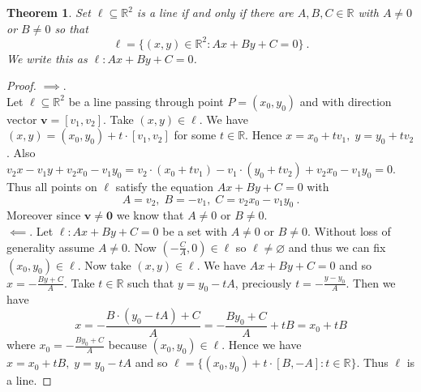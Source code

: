 \documentclass[a4paper,12pt]{report}
\newtheorem{theorem}{Theorem}
\begin{document}
\begin{theorem}\label{Linear Equation Defines a Line}
  Set $\ell\subseteq\mathbb{R}^2$ is a line if and only if there are $A,B,C\in\mathbb{R}$ with $A\ne 0$ or $B\ne 0$ so that 
  \[
    \ell=\{(x,y)\in\mathbb{R}^2:Ax+By+C=0\} ~.
  \]
  We write this as $\ell:Ax+By+C=0$.
\end{theorem}
\begin{proof}

  $\implies$. \\
  Let $\ell\subseteq\mathbb{R}^2$ be a line passing through point $P=(x_0,y_0)$ and with direction vector $\mathbf{v}=[v_1,v_2]$. Take $(x,y)\in\ell$. We have $(x,y)=(x_0,y_0)+t\cdot [v_1,v_2]$ for some $t\in\mathbb{R}$. Hence $x=x_0+tv_1, \; y=y_0+tv_2$. Also $v_2x-v_1y+v_2x_0-v_1y_0=v_2\cdot (x_0+tv_1)-v_1\cdot (y_0+tv_2)+v_2x_0-v_1y_0=0$. Thus all points on $\ell$ satisfy the equation $Ax+By+C=0$ with 
  \[
    A=v_2, \; B=-v_1, \; C=v_2x_0-v_1y_0 ~.
  \]
  Moreover since $\mathbf{v}\ne\mathbf{0}$ we know that $A\ne 0$ or $B\ne 0$.
  \\ $\impliedby$.
  Let $\ell:Ax+By+C=0$ be a set with $A\ne 0$ or $B\ne 0$. Without loss of generality assume $A\ne 0$. Now $(-\frac{C}{A},0)\in\ell$ so $\ell\ne\varnothing$ and thus we can fix $(x_0,y_0)\in\ell$. Now take $(x,y)\in\ell$. We have $Ax+By+C=0$ and so $x=-\frac{By+C}{A}$. Take $t\in\mathbb{R}$ such that $y=y_0-tA$, preciously $t=-\frac{y-y_0}{A}$. Then we have 
  \[
    x=-\frac{B\cdot(y_0-tA)+C}{A}=-\frac{By_0+C}{A}+tB=x_0+tB
  \]
  where $x_0=-\frac{By_0+C}{A}$ because $(x_0,y_0)\in\ell$. Hence we have $x=x_0+tB, \; y=y_0-tA$ and so $\ell=\{(x_0,y_0)+t\cdot [B,-A]:t\in\mathbb{R}\}$. Thus $\ell$ is a line.

\end{proof}
\end{document}
